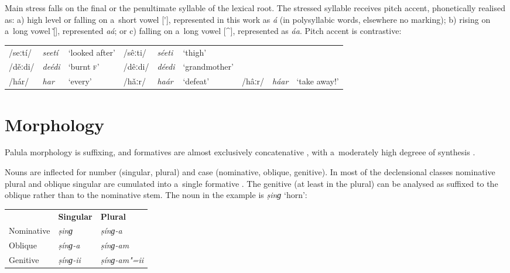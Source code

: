 Main stress falls on the final or the penultimate syllable of the lexical root. The stressed
syllable receives pitch accent, phonetically realised as: a) high level or falling on a~short vowel
[\'{}], represented in this work as \textit{á} (in polysyllabic words, elsewhere no marking); b)
rising on a~long vowel [\v{}], represented \textit{aá}; or c) falling on a~long vowel [\^{}],
represented as \textit{áa}. Pitch accent is contrastive:


\begin{table}[H]
\begin{tabularx}{\textwidth}{ l l Q l l Q l l Q }
/seːtí/ &
\textit{seetí} &
`looked after' &
/sêːti/ &
\textit{séeti} &
`thigh' &
&
&
\\
/děːdi/ &
\textit{deédi} &
`burnt \textsc{f}' &
/dêːdi/ &
\textit{déedi} &
`grand\-mother' & & &
\\
/hár/ &
\textit{har} &
`every' &
/hǎːr/ &
\textit{haár} &
`defeat' &
/hâːr/ &
\textit{háar} &
`take away!' \\
\end{tabularx}
\end{table}


\section{Morphology}
\label{sec:2-2}

Palula morphology is suffixing, and formatives are almost exclusively concatenative \citep[86--9]{bickelnichols2005a}, with a~moderately high degreee of synthesis \citep[94--97]{bickelnichols2005c}. 


Nouns are inflected for number (singular, plural) and case (nominative, oblique, genitive). In most of the declensional classes nominative plural and oblique singular are cumulated into a~single formative \citep[90--93]{bickelnichols2005b}. The genitive (at least in the plural) can be analysed as suffixed to the oblique rather than to the nominative stem. The noun in the example is \textit{ṣinɡ} `horn':


\begin{table}[H]
\begin{tabular}{ l l l }
&
\textbf{Singular} &
\textbf{Plural} \\
Nominative &
\textit{ṣinɡ} &
\textit{ṣínɡ-a} \\
Oblique &
\textit{ṣínɡ-a} &
\textit{ṣínɡ-am} \\
Genitive &
\textit{ṣínɡ-ii} &
\textit{ṣínɡ-am"=ii} \\
\end{tabular}
\end{table}



